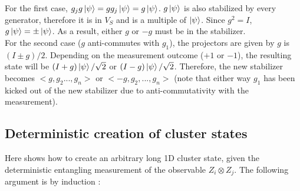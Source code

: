 \documentclass[letterpaper,10pt]{article}
\begin{document}
For the first case, $g_jg\Ket{\psi}=gg_j\Ket{\psi}=g\Ket{\psi}$. $g\Ket{\psi}$ is also stabilized by every generator, therefore it is in $V_S$ and is a multiple of $\Ket{\psi}$. Since $g^2=I$, $g\Ket{\psi}=\pm\Ket{\psi}$. As a result, either $g$ or $-g$ must be in the stabilizer.\\
For the second case ($g$ anti-commutes with $g_1$), the projectors are given by $g$ is $(I\pm g)/2$. Depending on the measurement outcome ($+1$ or $-1$), the resulting state will be $(I+g)\Ket{\psi}/\sqrt{2}$ or $(I-g)\Ket{\psi}/\sqrt{2}$. Therefore, the new stabilizer becomes $<g,g_2...,g_n>$ or $<-g,g_2,...,g_n>$ (note that either way $g_1$ has been kicked out of the new stabilizer due to anti-commutativity with the measurement).

\subsection{Deterministic creation of cluster states}
\label{subsec:dcc}
Here shows how to create an arbitrary long 1D cluster state, given the deterministic entangling measurement of the observable $Z_i\otimes Z_j$. The following argument is by induction \cite{rrdoc}:\\
\end{document}
